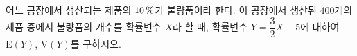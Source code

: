 어느 공장에서 생산되는 제품의 $10\mkern3mu \%$가 불량품이라 한다. 이 공장에서 생산된 $400$개의 제품 중에서 불량품의 개수를 확률변수 $X$라 할 때, 확률변수 $Y=\dfrac{3}{2}X-5$에 대하여 $\mathrm{E}(Y)$, $\mathrm{V}(Y)$를 구하시오.
